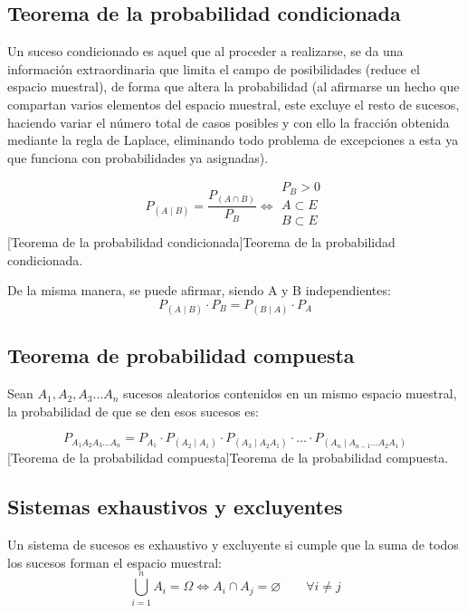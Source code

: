 \subsection{Teorema de la probabilidad condicionada}
Un suceso condicionado es aquel que al proceder a realizarse, se da una información extraordinaria que limita  el campo de posibilidades (reduce el espacio muestral), de forma que altera la probabilidad (al afirmarse un hecho que compartan varios elementos del espacio muestral, este excluye el resto de sucesos, haciendo variar el número total de casos posibles y con ello la fracción obtenida mediante la regla de Laplace, eliminando todo problema de excepciones a esta ya que funciona con probabilidades ya asignadas).
\begin{center}
     \begin{equation}
        P_{\left( A\mid B\right) } = \dfrac{P_{\left( A\cap B\right)}}{P_{B}} \iff
        \begin{array}{c}
            P_B > 0\\
            A \subset E\\
            B \subset E\\
        \end{array}
    \end{equation}
    [Teorema de la probabilidad condicionada]{Teorema de la probabilidad condicionada.}
\end{center}
De la misma manera, se puede afirmar, siendo A y B independientes: \[ P_{\left( A\mid B\right) } \cdot P_B = P_{\left( B\mid A\right) }\cdot P_A\]
\subsection{Teorema de probabilidad compuesta}
Sean $A_1 , A_2 , A_3 \dots A_n$ sucesos aleatorios contenidos en un mismo espacio muestral, la probabilidad de que se den esos sucesos es:
\begin{center}
    \begin{equation}
        P_{A_1 A_2 A_3\dots A_n} = P_{A_1}\cdot P_{\left( A_2\mid A_1\right) }\cdot P_{\left( A_3\mid A_2 A_1\right) }\cdot\dots\cdot P_{\left( A_n\mid A_{n-1}\dots A_2 A_1\right) }
    \end{equation}
    [Teorema de la probabilidad compuesta]{Teorema de la probabilidad compuesta.}
\end{center}
\subsection{Sistemas exhaustivos y excluyentes}
Un sistema de sucesos es exhaustivo y excluyente si cumple que la suma de todos los sucesos forman el espacio muestral:
\begin{equation*}
    \bigcup_{i=1}^n A_i = \Omega \iff A_i \cap A_j = \varnothing \qquad\forall i \neq  j
\end{equation*}
